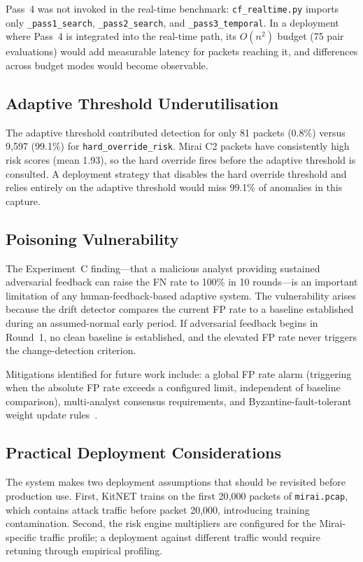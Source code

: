 \documentclass[preprint,12pt,authoryear]{elsarticle}
\begin{document}
Pass~4 was not invoked in the real-time benchmark: \texttt{cf\_realtime.py}
imports only \texttt{\_pass1\_search}, \texttt{\_pass2\_search}, and
\texttt{\_pass3\_temporal}. In a deployment where Pass~4 is integrated into
the real-time path, its $O(n^2)$ budget (75 pair evaluations) would add
measurable latency for packets reaching it, and differences across budget modes
would become observable.

\subsection{Adaptive Threshold Underutilisation}
\label{sec:disc_threshold}

The adaptive threshold contributed detection for only 81 packets (0.8\%) versus
9{,}597 (99.1\%) for \texttt{hard\_override\_risk}. Mirai C2 packets have
consistently high risk scores (mean 1.93), so the hard override fires before
the adaptive threshold is consulted. A deployment strategy that disables the
hard override threshold and relies entirely on the adaptive threshold would miss
99.1\% of anomalies in this capture.

\subsection{Poisoning Vulnerability}
\label{sec:disc_poison}

The Experiment~C finding---that a malicious analyst providing sustained
adversarial feedback can raise the FN rate to 100\% in 10 rounds---is an
important limitation of any human-feedback-based adaptive system. The
vulnerability arises because the drift detector compares the current FP rate to
a baseline established during an assumed-normal early period. If adversarial
feedback begins in Round~1, no clean baseline is established, and the elevated
FP rate never triggers the change-detection criterion.

Mitigations identified for future work include: a global FP rate alarm
(triggering when the absolute FP rate exceeds a configured limit, independent of
baseline comparison), multi-analyst consensus requirements, and
Byzantine-fault-tolerant weight update rules~\citep{Apruzzese2019}.

\subsection{Practical Deployment Considerations}
\label{sec:disc_deployment}

The system makes two deployment assumptions that should be revisited before
production use. First, KitNET trains on the first 20{,}000 packets of
\texttt{mirai.pcap}, which contains attack traffic before packet 20{,}000,
introducing training contamination. Second, the risk engine multipliers are
configured for the Mirai-specific traffic profile; a deployment against different
traffic would require retuning through empirical profiling.
\end{document}
